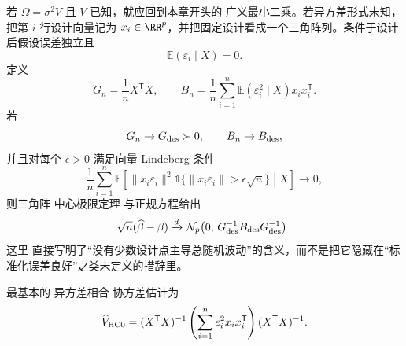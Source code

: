 \begin{theorem}
若 $\Omega=\sigma^2V$ 且 $V$ 已知，就应回到本章开头的 广义最小二乘。若异方差形式未知，把第 $i$ 行设计向量记为 $x_i\in\RR^p$，并把固定设计看成一个三角阵列。条件于设计后假设误差独立且
\[
 \mathbb E(\varepsilon_i\mid X)=0.
\]
定义
\[
 G_n=\frac1nX^{\mathsf T}X,
 \qquad
 B_n=\frac1n\sum_{i=1}^n
 \mathbb E(\varepsilon_i^2\mid X)x_ix_i^{\mathsf T}.
\]
若
\[
 G_n\to G_{\rm des}\succ0,
 \qquad
 B_n\to B_{\rm des},
\]
并且对每个 $\epsilon>0$ 满足向量 Lindeberg 条件
\begin{equation}\label{eq:math-stat-fixed-design-lindeberg}
 \frac1n\sum_{i=1}^n
 \mathbb E\!\left[
 \|x_i\varepsilon_i\|^2
 \mathds{1}\{\|x_i\varepsilon_i\|>\epsilon\sqrt n\}
 \middle|X
 \right]
 \longrightarrow0,
\end{equation}
则三角阵 中心极限定理 与正规方程给出
\[
 \sqrt n(\widehat\beta-\beta)
 \xrightarrow{d}
 \mathcal N_p\!\left(
 0,\,
 G_{\rm des}^{-1}B_{\rm des}G_{\rm des}^{-1}
 \right).
\]
这里  直接写明了“没有少数设计点主导总随机波动”的含义，而不是把它隐藏在“标准化误差良好”之类未定义的措辞里。
\end{theorem}

\begin{definition}[HC0 协方差估计]
最基本的 异方差相合 协方差估计为
\begin{equation*}\widehat V_{\rm HC0}
 =(X^{\mathsf T}X)^{-1}
 \left(\sum_{i=1}^ne_i^2x_ix_i^{\mathsf T}\right)
 (X^{\mathsf T}X)^{-1}.
\end{equation*}
\end{definition}

